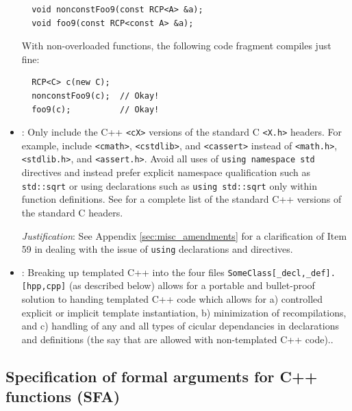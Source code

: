\begin{itemize}
{\small\begin{verbatim}
  void nonconstFoo9(const RCP<A> &a);
  void foo9(const RCP<const A> &a);
\end{verbatim}}

With non-overloaded functions, the following code fragment compiles just
fine:

{\small\begin{verbatim}
  RCP<C> c(new C);
  nonconstFoo9(c);  // Okay!
  foo9(c);          // Okay!
\end{verbatim}}

{}\item\GCGStandardCppHeaders: Only include the C++ {}\texttt{<cX>} versions
of the standard C {}\texttt{<X.h>} headers.  For example, include
{}\texttt{<cmath>}, {}\texttt{<cstdlib>}, and {}\texttt{<cassert>} instead of
{}\texttt{<math.h>}, {}\texttt{<stdlib.h>}, and {}\texttt{<assert.h>}.  Avoid
all uses of {}\texttt{using namespace std} directives and instead prefer
explicit namespace qualification such as {}\texttt{std::sqrt} or using
declarations such as {}\texttt{using std::sqrt} only within function
definitions.  See {}\cite[Section 16.1.2]{stroustrup97} for a complete list of
the standard C++ versions of the standard C headers.

{}\textit{Justification}: See Appendix {}\ref{sec:misc_amendments} for a
clarification of Item 59 in {}\cite{C++CodingStandards05} dealing with the
issue of {}\texttt{using} declarations and directives.

{}\item\GCGTemplateHeaders: Breaking up templated C++ into the four
files {}\texttt{SomeClass[\_decl,\_def].[hpp,cpp]} (as described
below) allows for a portable and bullet-proof solution to handing
templated C++ code which allows for a) controlled explicit or implicit
template instantiation, b) minimization of recompilations, and c)
handling of any and all types of cicular dependancies in declarations
and definitions (the say that are allowed with non-templated C++
code)..

\end{itemize}


%
\subsection{Specification of formal arguments for C++ functions (SFA)}
\label{sec:func_arguments}
%


